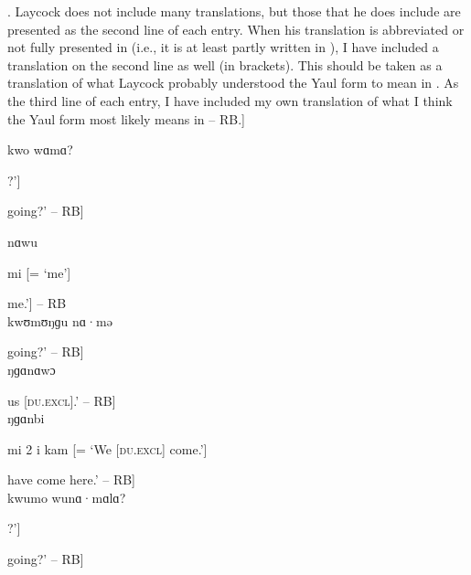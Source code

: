 \noindent
[Editor’s note: The remainder of Laycock’s Yaul notes are devoted to “preliminary grammatical testing” \citep[71]{Laycock1973}. Laycock does not include many translations, but those that he does include are presented as the second line of each entry. When his translation is abbreviated or not fully presented in  (i.e., it is at least partly written in ), I have included a translation on the second line as well (in brackets). This should be taken as a translation of what Laycock probably understood the Yaul form to mean in . As the third line of each entry, I have included my own translation of what I think the Yaul form most likely means in  -- RB.]\\


\noindent kwo wɑmɑ?

\noindent [‘Who are you [\textsc{sg}]?’]

\noindent [‘Who are you [\textsc{sg}] [who is] going?’ -- RB]\\

\newpage

\noindent nɑwu

\noindent mi [= ‘me’]

\noindent [‘[It’s] me.’] -- RB\\

\noindent kwʊmʊŋɡu nɑ·mə


\noindent [‘Who are you two [who are] going?’ -- RB]\\

\noindent ŋɡɑnɑwɔ

\noindent [‘us two’]

\noindent [‘[It’s] us [\textsc{du.excl}].’ -- RB]\\

\noindent ŋɡɑnbi

\noindent mi 2 i kam [= ‘We [\textsc{du.excl}] come.’]

\noindent [‘We [\textsc{du.excl}] have come here.’ -- RB]\\

\noindent kwumo wunɑ·mɑlɑ?

\noindent [‘Who are you [\textsc{pl}]?’]

\noindent [‘Who are you [\textsc{pl}] [who are] going?’ -- RB]\\

